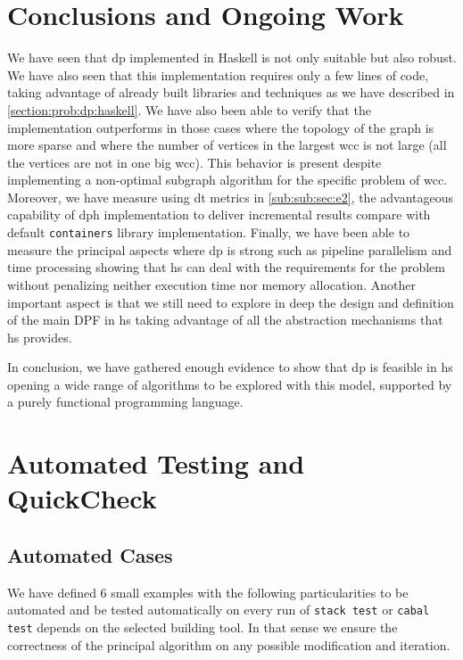 \documentclass[preprint]{elsarticle}
\begin{document}
\section{Conclusions and Ongoing Work}
We have seen that \acrlong{dp} implemented in Haskell is not only suitable but also robust. We have also seen that this implementation requires only a few lines of code, taking advantage of already built libraries and techniques as we have described in \autoref{section:prob:dp:haskell}.
We have also been able to verify that the implementation outperforms in those cases where the topology of the graph is more sparse and where the number of vertices in the largest \acrshort{wcc} is not large (all the vertices are not in one big \acrshort{wcc}). This behavior is present despite implementing a non-optimal subgraph algorithm for the specific problem of \acrshort{wcc}.
Moreover, we have measure using \acrshort{dt} metrics in \autoref{sub:sub:sec:e2}, the advantageous capability of \acrshort{dph} implementation to deliver incremental results compare with default \texttt{containers} library implementation.
Finally, we have been able to measure the principal aspects where \acrshort{dp} is strong such as pipeline parallelism and time processing showing that \acrshort{hs} can deal with the requirements for the problem without penalizing neither execution time nor memory allocation.
Another important aspect is that we still need to explore in deep the design and definition of the main DPF in \acrshort{hs} taking advantage of all the abstraction mechanisms that \acrshort{hs} provides.

In conclusion, we have gathered enough evidence to show that \acrlong{dp} is feasible in \acrlong{hs} opening a wide range of algorithms to be explored with this model, supported by a purely functional programming language.



\iffalse
\appendix
\section{Automated Testing and QuickCheck}\label{apx:1}
\subsection{Automated Cases}
We have defined 6 small examples with the following particularities to be automated and be tested automatically on every run of \texttt{stack test} or \texttt{cabal test} depends on the selected building tool. In that sense
we ensure the correctness of the principal algorithm on any possible modification and iteration. 
\end{document}
